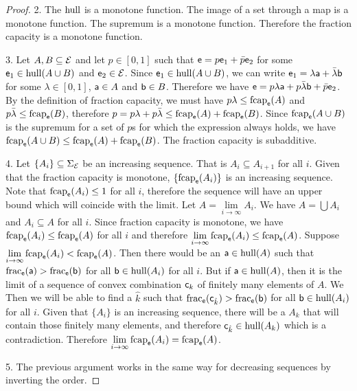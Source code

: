 \begin{mathSection}
\begin{proof}
		2. The $\hull$ is a monotone function. The image of a set through a map is a monotone function. The supremum is a monotone function. Therefore the fraction capacity is a monotone function.
		
		3. Let $A, B \subseteq \Ens$ and let $p \in [0,1]$ such that $\ens = p \ens_1 + \bar{p} \ens_2$ for some $\ens_1 \in \hull(A \cup B)$ and $\ens_2 \in \Ens$. Since $\ens_1 \in \hull(A \cup B)$, we can write $\ens_1 = \lambda \ens[a] + \bar{\lambda} \ens[b]$ for some $\lambda \in [0,1]$, $\ens[a] \in A$ and $\ens[b] \in B$. Therefore we have $\ens = p \lambda \ens[a] + p \bar{\lambda} \ens[b] + \bar{p} \ens_2$. By the definition of fraction capacity, we must have $p\lambda \leq \fcap_{\ens}(A)$ and $p\bar{\lambda} \leq \fcap_{\ens}(B)$, therefore $p = p\lambda + p\bar{\lambda} \leq \fcap_{\ens}(A) + \fcap_{\ens}(B)$. 	Since $\fcap_{\ens}(A \cup B)$ is the supremum for a set of $p$s for which the expression always holds, we have $\fcap_{\ens}(A \cup B) \leq \fcap_{\ens}(A) + \fcap_{\ens}(B)$. The fraction capacity is subadditive.
		
		4. Let $\{A_i\} \subseteq \Sigma_{\Ens}$ be an increasing sequence. That is $A_i \subseteq A_{i+1}$ for all $i$. Given that the fraction capacity is monotone, $\{\fcap_{\ens}(A_i)\}$ is an increasing sequence. Note that $\fcap_{\ens}(A_i) \leq 1$ for all $i$, therefore the sequence will have an upper bound which will coincide with the limit. Let $A = \lim\limits_{i \to \infty} A_i$. We have $A = \bigcup A_i$ and $A_i \subseteq A$ for all $i$. Since fraction capacity is monotone, we have $\fcap_{\ens}(A_i) \leq \fcap_{\ens}(A)$ for all $i$ and therefore $\lim\limits_{i \to \infty} \fcap_{\ens}(A_i) \leq \fcap_{\ens}(A)$. Suppose $\lim\limits_{i \to \infty} \fcap_{\ens}(A_i) < \fcap_{\ens}(A)$. Then there would be an $\ens[a] \in \hull(A)$ such that $\size_{\ens}(\ens[a]) > \size_{\ens}(\ens[b])$ for all $\ens[b] \in \hull(A_i)$ for all $i$. But if $\ens[a] \in \hull(A)$, then it is the limit of a sequence of convex combination $\ens[c]_k$ of finitely many elements of $A$. We Then we will be able to find a $\hat{k}$ such that $\size_{\ens}(\ens[c]_{\hat{k}}) > \size_{\ens}(\ens[b])$ for all $\ens[b] \in \hull(A_i)$ for all $i$. Given that $\{A_i\}$ is an increasing sequence, there will be a $A_k$ that will contain those finitely many elements, and therefore $\ens[c]_{\hat{k}} \in \hull(A_k)$ which is a contradiction. Therefore $\lim\limits_{i \to \infty} \fcap_{\ens}(A_i) = \fcap_{\ens}(A)$.
		
		5. The previous argument works in the same way for decreasing sequences by inverting the order.
	\end{proof}
\end{mathSection}

